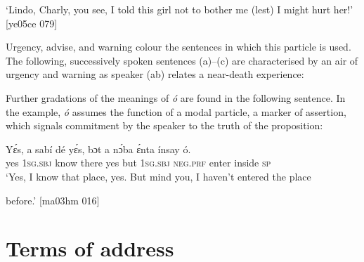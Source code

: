 \glt ‘Lindo, Charly, you see, I told this girl not to bother me (lest) I might 
hurt her!’ [ye05ce 079]
\z

Urgency, advise, and warning colour the sentences in which this particle is used. The following, successively spoken sentences (a)–(c) are characterised by an air of urgency and warning as speaker (ab) relates a near-death experience:


\ea%
    \label{ex:key:1672}
\z\z

Further gradations of the meanings of \textit{ó} are found in the following sentence. In the example, \textit{ó} assumes the function of a modal particle, a marker of assertion, which signals commitment by the speaker to the truth of the proposition:


\ea%
    \label{ex:key:1673}
    \gll Yɛ́s,  a    sabí    dé    yɛ́s,  bɔt  a    nɔ́ba  ɛ́nta    ínsay  ó.\\
yes  \textsc{1sg.sbj}  know  there  yes  but  \textsc{1sg.sbj}  \textsc{neg}.\textsc{prf}  enter  inside  \textsc{sp}\\

\glt ‘Yes, I know that place, yes. But mind you, I haven’t entered the place 


\glt before.’ [ma03hm 016]
\z

\section{Terms of address}\label{sec:12.3}

